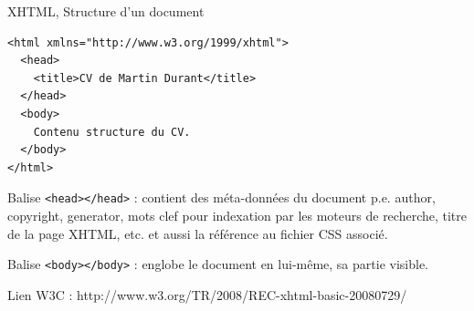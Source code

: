 \begin{frame}{XHTML, Structure d'un document}

\begin{lstlisting}[inputencoding=utf8/latin1]
<html xmlns="http://www.w3.org/1999/xhtml">
  <head>
    <title>CV de Martin Durant</title>
  </head>
  <body>
    Contenu structure du CV.
  </body>
</html>
\end{lstlisting}

Balise \verb?<head></head>? : contient des m\'eta-donn\'ees du document p.e. author, copyright, generator, mots clef pour indexation par les moteurs de recherche, titre de la page XHTML, etc. et aussi la r\'ef\'erence au fichier CSS associ\'e.

\medskip

Balise \verb?<body></body>? : englobe le document en lui-m\^eme, sa partie visible.

\begin{flushright}
Lien W3C : http://www.w3.org/TR/2008/REC-xhtml-basic-20080729/
\end{flushright}
\end{frame}


